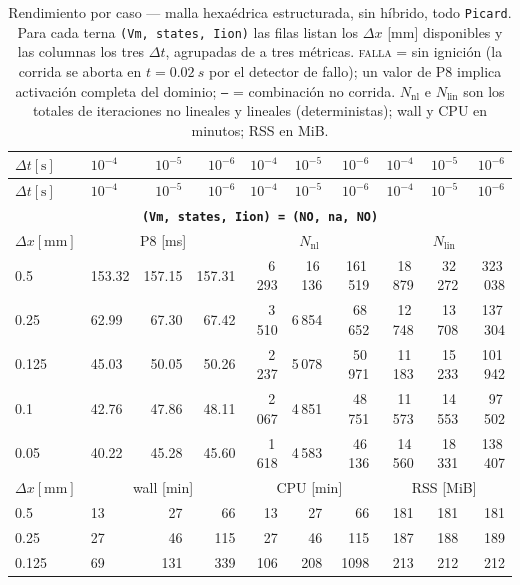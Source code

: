 \documentclass[11pt,a4paper]{article}
\newcommand{\code}[1]{\texttt{\small #1}}
\begin{document}
\label{sec:res2d:hexaF}
\begin{center}\footnotesize
\begin{longtable}{l|lrr|rrr|rrr}
\caption{Rendimiento por caso --- malla hexa\'edrica estructurada, sin h\'ibrido, todo \code{Picard}. Para cada terna \code{(Vm, states, Iion)} las filas listan los $\Delta x$ [mm] disponibles y las columnas los tres $\Delta t$, agrupadas de a tres m\'etricas. \textsc{falla} = sin ignici\'on (la corrida se aborta en $t=\SI{0.02}{s}$ por el detector de fallo); un valor de P8 implica activaci\'on completa del dominio; \texttt{--} = combinaci\'on no corrida. $N_{\mathrm{nl}}$ e $N_{\mathrm{lin}}$ son los totales de iteraciones no lineales y lineales (deterministas); wall y CPU en minutos; RSS en MiB.}\label{tab:res2d:hexaF}\\
\toprule $ \Delta t [\text{s}]$ & $10^{-4}$ & $10^{-5}$ & $10^{-6}$ & $10^{-4}$ & $10^{-5}$ & $10^{-6}$ & $10^{-4}$ & $10^{-5}$ & $10^{-6}$\\ \midrule\endfirsthead
\toprule $ \Delta t [\text{s}]$ & $10^{-4}$ & $10^{-5}$ & $10^{-6}$ & $10^{-4}$ & $10^{-5}$ & $10^{-6}$ & $10^{-4}$ & $10^{-5}$ & $10^{-6}$\\ \midrule\endhead
\multicolumn{10}{c}{\textbf{\code{(Vm, states, Iion) = (NO, na, NO)}}}\\\hline
$ \Delta x [\text{mm}] $ & \multicolumn{3}{c|}{P8 [ms]} & \multicolumn{3}{c|}{$N_{\mathrm{nl}}$} & \multicolumn{3}{c|}{$N_{\mathrm{lin}}$}\\
0.5 & 153.32 & 157.15 & 157.31 & 6\,293 & 16\,136 & 161\,519 & 18\,879 & 32\,272 & 323\,038\\
0.25 & 62.99 & 67.30 & 67.42 & 3\,510 & 6\,854 & 68\,652 & 12\,748 & 13\,708 & 137\,304\\
0.125 & 45.03 & 50.05 & 50.26 & 2\,237 & 5\,078 & 50\,971 & 11\,183 & 15\,233 & 101\,942\\
0.1 & 42.76 & 47.86 & 48.11 & 2\,067 & 4\,851 & 48\,751 & 11\,573 & 14\,553 & 97\,502\\
0.05 & 40.22 & 45.28 & 45.60 & 1\,618 & 4\,583 & 46\,136 & 14\,560 & 18\,331 & 138\,407\\
\hline
$ \Delta x [\text{mm}] $ & \multicolumn{3}{c|}{wall [min]} & \multicolumn{3}{c|}{CPU [min]} & \multicolumn{3}{c|}{RSS [MiB]}\\
0.5 & 13 & 27 & 66 & 13 & 27 & 66 & 181 & 181 & 181\\
0.25 & 27 & 46 & 115 & 27 & 46 & 115 & 187 & 188 & 189\\
0.125 & 69 & 131 & 339 & 106 & 208 & 1098 & 213 & 212 & 212\\

\end{longtable}
\end{center}
\end{document}
